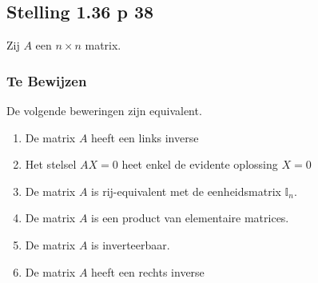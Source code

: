 \documentclass[lineaire_algebra_oplossingen.tex]{subfiles}
\begin{document}
\subsection{Stelling 1.36 p 38}
\label{1.36}
Zij $A$ een $n\times n$ matrix.

\subsubsection*{Te Bewijzen}
De volgende beweringen zijn equivalent.
\begin{enumerate}
\item De matrix $A$ heeft een links inverse
\item Het stelsel $AX = 0$ heet enkel de evidente oplossing $X=0$
\item De matrix $A$ is rij-equivalent met de eenheidsmatrix $\mathbb{I}_n$.
\item De matrix $A$ is een product van elementaire matrices.
\item De matrix $A$ is inverteerbaar.
\item De matrix $A$ heeft een rechts inverse
\end{enumerate}
\end{document}
